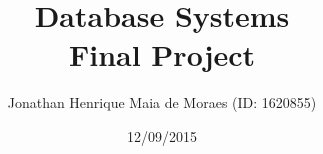 \title{Database Systems \\ Final Project}
\author{Jonathan Henrique Maia de Moraes (ID: 1620855)}
\date{12/09/2015}
\maketitle
